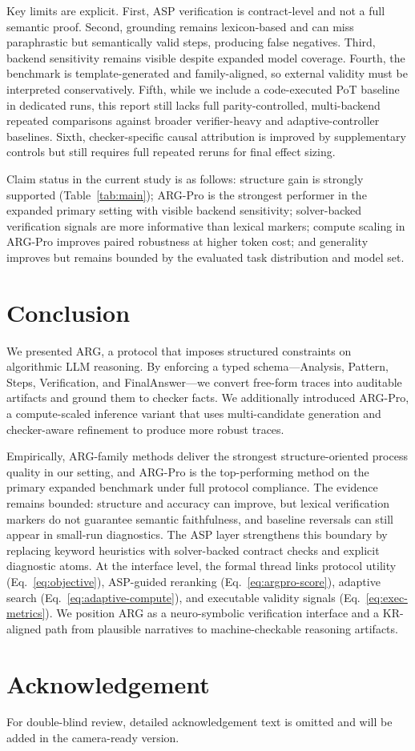 \documentclass{article}
\begin{document}
Key limits are explicit. First, ASP verification is contract-level and not a full semantic proof. Second, grounding remains lexicon-based and can miss paraphrastic but semantically valid steps, producing false negatives. Third, backend sensitivity remains visible despite expanded model coverage. Fourth, the benchmark is template-generated and family-aligned, so external validity must be interpreted conservatively. Fifth, while we include a code-executed PoT baseline in dedicated runs, this report still lacks full parity-controlled, multi-backend repeated comparisons against broader verifier-heavy and adaptive-controller baselines. Sixth, checker-specific causal attribution is improved by supplementary controls but still requires full repeated reruns for final effect sizing.

Claim status in the current study is as follows: structure gain is strongly supported (Table~\ref{tab:main}); ARG-Pro is the strongest performer in the expanded primary setting with visible backend sensitivity; solver-backed verification signals are more informative than lexical markers; compute scaling in ARG-Pro improves paired robustness at higher token cost; and generality improves but remains bounded by the evaluated task distribution and model set.

\section{Conclusion}
We presented ARG, a protocol that imposes structured constraints on algorithmic LLM reasoning. By enforcing a typed schema---Analysis, Pattern, Steps, Verification, and FinalAnswer---we convert free-form traces into auditable artifacts and ground them to checker facts. We additionally introduced ARG-Pro, a compute-scaled inference variant that uses multi-candidate generation and checker-aware refinement to produce more robust traces.

Empirically, ARG-family methods deliver the strongest structure-oriented process quality in our setting, and ARG-Pro is the top-performing method on the primary expanded benchmark under full protocol compliance. The evidence remains bounded: structure and accuracy can improve, but lexical verification markers do not guarantee semantic faithfulness, and baseline reversals can still appear in small-run diagnostics. The ASP layer strengthens this boundary by replacing keyword heuristics with solver-backed contract checks and explicit diagnostic atoms. At the interface level, the formal thread links protocol utility (Eq.~\eqref{eq:objective}), ASP-guided reranking (Eq.~\eqref{eq:argpro-score}), adaptive search (Eq.~\eqref{eq:adaptive-compute}), and executable validity signals (Eq.~\eqref{eq:exec-metrics}). We position ARG as a neuro-symbolic verification interface and a KR-aligned path from plausible narratives to machine-checkable reasoning artifacts.

\section*{Acknowledgement}
For double-blind review, detailed acknowledgement text is omitted and will be added in the camera-ready version.

\FloatBarrier


\end{document}
